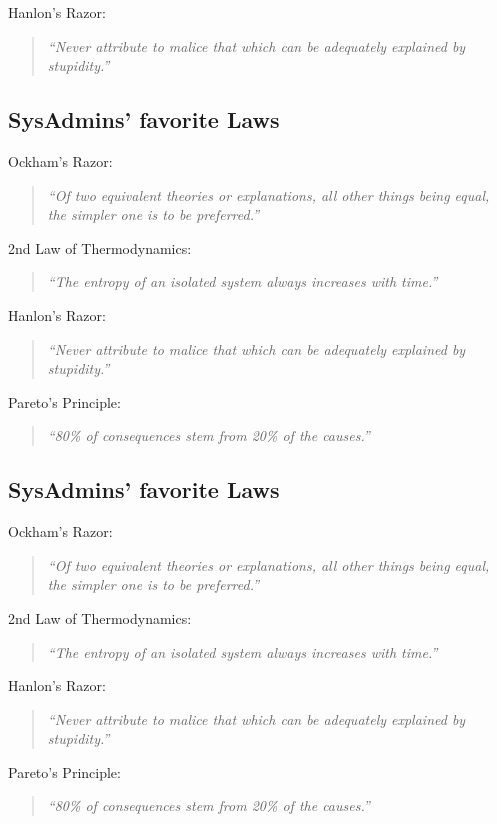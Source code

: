 \documentclass[xga]{xdvislides}
\newcommand{\smallish}{\fontsize{18}{18}\selectfont}
\begin{document}
Hanlon's Razor:
\begin{quote}
{\em ``Never attribute to malice that which can be adequately explained by
stupidity.''}
\end{quote}
\Normalsize

\subsection{SysAdmins' favorite Laws}
\smallish
Ockham's Razor:
\begin{quote}
{\em ``Of two equivalent theories or explanations, all other things being
equal, the simpler one is to be preferred.''}
\end{quote}

2nd Law of Thermodynamics:
\begin{quote}
{\em ``The entropy of an isolated system always increases with time.''}
\end{quote}

Hanlon's Razor:
\begin{quote}
{\em ``Never attribute to malice that which can be adequately explained by
stupidity.''}
\end{quote}

Pareto's Principle:
\begin{quote}
{\em ``80\% of consequences stem from 20\% of the causes.''}
\end{quote}
\Normalsize

\subsection{SysAdmins' favorite Laws}
\smallish
Ockham's Razor:
\begin{quote}
{\em ``Of two equivalent theories or explanations, all other things being
equal, the simpler one is to be preferred.''}
\end{quote}

2nd Law of Thermodynamics:
\begin{quote}
{\em ``The entropy of an isolated system always increases with time.''}
\end{quote}

Hanlon's Razor:
\begin{quote}
{\em ``Never attribute to malice that which can be adequately explained by
stupidity.''}
\end{quote}

Pareto's Principle:
\begin{quote}
{\em ``80\% of consequences stem from 20\% of the causes.''}
\end{quote}
\end{document}
